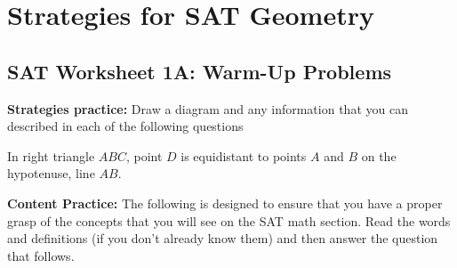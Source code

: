 \chapter[SAT Geometry]{Strategies for SAT Geometry}

\section{SAT Worksheet 1A: Warm-Up Problems}

\textbf{Strategies practice:} Draw a diagram and any information that you can described in each of the following questions

\begin{multienumerate}
{In right triangle $ABC$, point $D$ is equidistant to points $A$ and $B$ on the hypotenuse, line $AB$.}
\end{multienumerate}

\vfill
\hrulefill

\textbf{Content Practice:} The following is designed to ensure that you have a proper grasp of the concepts that you will see on the SAT math section. Read the words and definitions (if you don't already know them) and then answer the question that follows.

